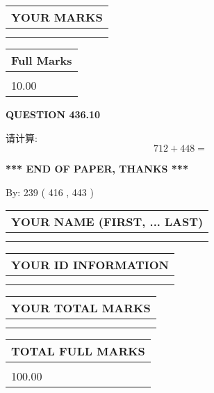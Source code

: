 \documentclass{ctexart}
\begin{document}
\noindent\begin{tabular}{|l|}
\hline
 YOUR MARKS  \\
\hline
 \\ 
 \\ 
\hline
\end{tabular}
\hspace{0.05in} \begin{tabular}{|l|}
\hline
 Full Marks  \\
\hline
 \\ 
10.00 \\
\hline
\end{tabular}
{\textbf{\Large{QUESTION
436.10 
}}}
  
  
 
请计算:
\begin{equation}
712 +  %
448 = \nonumber
\end{equation}
 

 

 
   
   
 \vspace{0.2in}
 
   
   
   
   
\vspace{1.0in} 
{\textbf{\large{ *** END OF PAPER, THANKS *** }}} 
   
   
\hspace{1.0in} By: 
 239 ( 416 ,  443 )
   
   
   
   
\newpage 
\setcounter{page}{ 
   437001 } 
   
   
   
   
\noindent\begin{tabular}{|l|}
\hline
YOUR NAME (FIRST, ... LAST)  \\
\hline
 \\ 
 \\ 
\hline
\end{tabular}
\hspace{0.05in} \begin{tabular}{|l|}
\hline
 YOUR   ID   INFORMATION  \\
\hline
 \\ 
 \\ 
\hline
\end{tabular}
   
   
\vspace{0.2in}\noindent\begin{tabular}{|l|}
\hline
YOUR TOTAL MARKS  \\
\hline
 \\ 
 \\ 
\hline
\end{tabular}
\hspace{0.05in} \begin{tabular}{|l|}
\hline
TOTAL FULL MARKS  \\
\hline
 \\ 
100.00 \\
\hline
\end{tabular}
   
\end{document}
